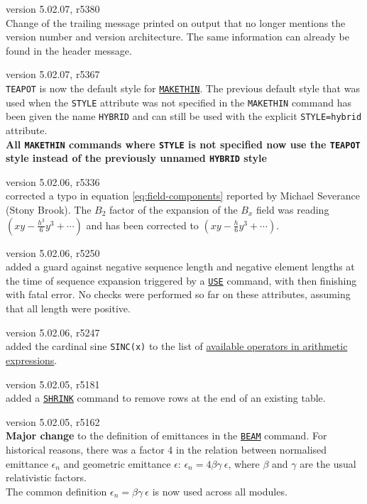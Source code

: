 \begin{madlist}
   version 5.02.07, r5380\\
  Change of the trailing message printed on output that no longer 
  mentions the version number and version architecture. 
  The same information can already be found in the header message.

   version 5.02.07, r5367\\
  \texttt{TEAPOT} is now the default style for 
  \hyperref[chap:makethin]{\texttt{MAKETHIN}}. 
  The previous default style that was used when the \texttt{STYLE} 
  attribute was not specified in the \texttt{MAKETHIN} command 
  has been given the name \texttt{HYBRID} 
  and can still be used with the explicit \texttt{STYLE=hybrid} attribute. \\
  \textbf{All \texttt{MAKETHIN} commands where \texttt{STYLE} is not specified now
  use the \texttt{TEAPOT} style instead of the previously unnamed \texttt{HYBRID} 
  style}

   version 5.02.06, r5336 \\
  corrected a typo in equation \ref{eq:field-components} 
  reported by Michael Severance (Stony Brook). 
  The $B_2$ factor of the expansion of the $B_x$ 
  field was reading $(xy - \frac{h^3}{6}y^3+\cdots)$ 
  and has been corrected to $(xy - \frac{h}{6}y^3+\cdots)$.

   version 5.02.06, r5250\\
  added a guard against negative sequence length and negative 
  element lengths at the time of sequence expansion triggered 
  by a \hyperref[sec:use]{\texttt{USE}} command, with \madx then 
  finishing with fatal error. No checks were performed so far 
  on these attributes, assuming that all length were positive.

   version 5.02.06, r5247\\
  added the cardinal sine \texttt{SINC(x)} to the list of 
  \hyperref[subsec:operator]{available operators in arithmetic 
  expressions}.

   version 5.02.05, r5181\\
  added a \hyperref[sec:shrink]{\texttt{SHRINK}} command to remove 
  rows at the end of an existing table.

   version 5.02.05, r5162\\
  \textbf{Major change} to the definition of emittances in the 
  \hyperref[chap:beam]{\texttt{BEAM}} command. For historical reasons, 
  there was a factor 4 in the relation between normalised emittance 
  $\epsilon_n$ and geometric emittance $\epsilon$: 
  $\epsilon_n = 4 \beta \gamma \ \epsilon$, where $\beta$ and 
  $\gamma$ are the usual relativistic factors. \\
  The common definition $\epsilon_n = \beta \gamma \ \epsilon$ 
  is now used across all \madx modules.
  

\end{madlist}
